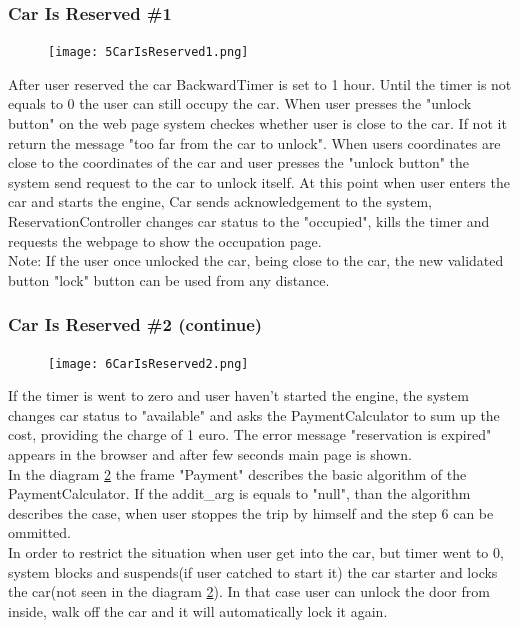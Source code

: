 \documentclass[12pt, letterpaper]{article}
\begin{document}
\subsubsection{Car Is Reserved \#1}
\begin{figure}[H]
\centering
\texttt{[image: 5CarIsReserved1.png]} %
\label{fig:5CarIsReserved1}
\end{figure}
\newpage
After user reserved the car BackwardTimer is set to 1 hour. Until the timer is not equals to 0 the user can still occupy the car. When user presses the "unlock button" on the web page system checkes whether user is close to the car. If not it return the message "too far from the car to unlock". When users coordinates are close to the coordinates of the car and user presses the "unlock button" the system send request to the car to unlock itself. At this point when user enters the car and starts the engine, Car sends acknowledgement to the system, ReservationController changes car status to the "occupied", kills the timer and requests the webpage to show the occupation page. \\ 
Note: If the user once unlocked the car, being close to the car, the new validated button "lock" button can be used from any distance. \\
\newpage
\subsubsection{Car Is Reserved \#2 (continue)}
\begin{figure}[H]
\centering
\texttt{[image: 6CarIsReserved2.png]} %
\label{fig:6CarIsReserved2}
\end{figure}
\newpage
If the timer is went to zero and user haven't started the engine, the system changes car status to "available" and asks the PaymentCalculator to sum up the cost, providing the charge of 1 euro. The error message "reservation is expired" appears in the browser and after few seconds main page is shown.  \\
In the diagram \ref{fig:6CarIsReserved2} the frame "Payment" describes the basic algorithm of the PaymentCalculator. If the addit\_arg is equals to "null", than the algorithm describes the case, when user stoppes the trip by himself and the step 6 can be ommitted. \\
In order to restrict the situation when user get into the car, but timer went to 0, system blocks and suspends(if user catched to start it) the car starter and locks the car(not seen in the diagram \ref{fig:6CarIsReserved2}). In that case user can unlock the door from inside, walk off the car and it will automatically lock it again.
\newpage
\end{document}

